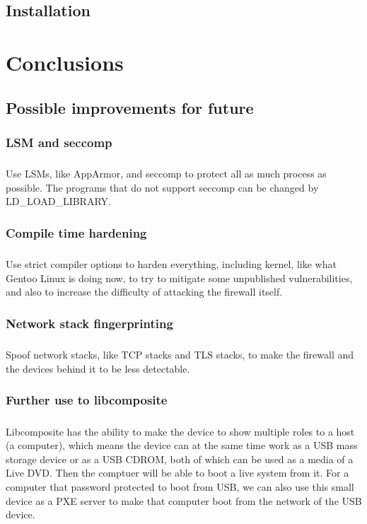 \documentclass[mscthesis]{usiinfthesis}
\begin{document}
\section{Installation}

\chapter{Conclusions}

\section{Possible improvements for future}
\subsection{LSM and seccomp}
\paragraph{}
Use LSMs, like AppArmor, and seccomp to protect all as much process as possible. The programs that do not support seccomp can be changed by LD\_LOAD\_LIBRARY.

\subsection{Compile time hardening}
\paragraph{}
Use strict compiler options to harden everything, including kernel, like what Gentoo Linux is doing now, to try to mitigate some unpublished vulnerabilities, and also to increase the difficulty of attacking the firewall itself.

\subsection{Network stack fingerprinting}
\paragraph{}
Spoof network stacks, like TCP stacks and TLS stacks, to make the firewall and the devices behind it to be less detectable.

\subsection{Further use to libcomposite}
\paragraph{}
Libcomposite has the ability to make the device to show multiple roles to a host (a computer), which means the device can at the same time work as a USB mass storage device or as a USB CDROM, both of which can be used as a media of a Live DVD. Then the comptuer will be able to boot a live system from it. For a computer that password protected to boot from USB, we can also use this small device as a PXE server to make that computer boot from the network of the USB device.
\end{document}
